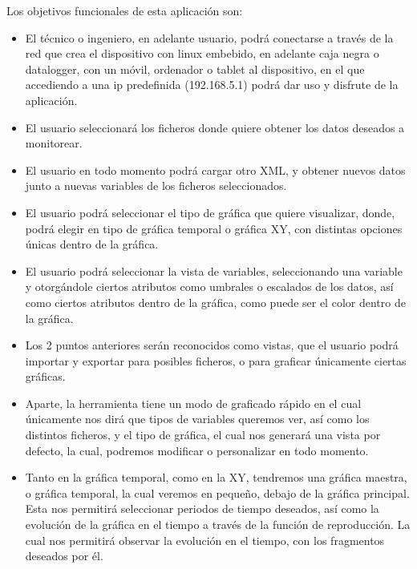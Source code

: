 Los objetivos funcionales de esta aplicación son:
\begin{itemize}
	\item El técnico o ingeniero, en adelante usuario, podrá conectarse a través de la red que crea el dispositivo con linux embebido, en adelante caja negra o datalogger, con un móvil, ordenador o tablet al dispositivo, en el que accediendo a una ip predefinida (192.168.5.1) podrá dar uso y disfrute de la aplicación.

	\item El usuario seleccionará los ficheros donde quiere obtener los datos deseados a monitorear.

	\item El usuario en todo momento podrá cargar otro XML, y obtener nuevos datos junto a nuevas variables de los ficheros seleccionados.
	
	\item El usuario podrá seleccionar el tipo de gráfica que quiere visualizar, donde, podrá elegir en tipo de gráfica temporal o gráfica XY, con distintas opciones únicas dentro de la gráfica.

	\item El usuario podrá seleccionar la vista de variables, seleccionando una variable y otorgándole ciertos atributos como umbrales o escalados de los datos, así como ciertos atributos dentro de la gráfica, como puede ser el color dentro de la gráfica.
	\item Los 2 puntos anteriores serán reconocidos como vistas, que el usuario podrá importar y exportar para posibles ficheros, o para graficar únicamente ciertas gráficas.

\item Aparte, la herramienta tiene un modo de graficado rápido en el cual únicamente nos dirá que tipos de variables queremos ver, así como los distintos ficheros, y el tipo de gráfica, el cual nos generará una vista por defecto, la cual, podremos modificar o personalizar en todo momento.

\item Tanto en la gráfica temporal, como en la XY, tendremos una gráfica maestra, o gráfica temporal, la cual veremos en pequeño, debajo de la gráfica principal. Esta nos permitirá seleccionar periodos de tiempo deseados, así como la evolución de la gráfica en el tiempo a través de la función de reproducción. La cual nos permitirá observar la evolución en el tiempo, con los fragmentos deseados por él.



\end{itemize}
